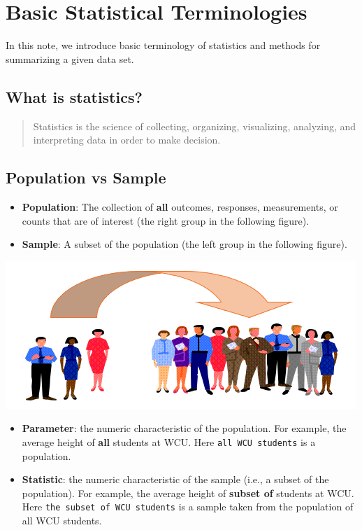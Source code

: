 \documentclass[
]{book}
\begin{document}
\hypertarget{basic-statistical-terminologies}{%
\section{Basic Statistical Terminologies}\label{basic-statistical-terminologies}}

In this note, we introduce basic terminology of statistics and methods for summarizing a given data set.

\hypertarget{what-is-statistics}{%
\subsection{What is statistics?}\label{what-is-statistics}}

\begin{quote}
Statistics is the science of collecting, organizing, visualizing, analyzing, and interpreting data in order to make decision.
\end{quote}

\hypertarget{population-vs-sample}{%
\subsection{Population vs Sample}\label{population-vs-sample}}

\begin{itemize}
\item
  \textbf{Population}: The collection of \textbf{all} outcomes, responses, measurements, or counts that are of interest (the right group in the following figure).
\item
  \textbf{Sample}: A subset of the population (the left group in the following figure).
\end{itemize}

\begin{center}\includegraphics[width=0.6\linewidth]{week01/popSample} \end{center}

\begin{itemize}
\item
  \textbf{Parameter}: the numeric characteristic of the population. For example, the average height of \textbf{all} students at WCU. Here \texttt{all\ WCU\ students} is a population.
\item
  \textbf{Statistic}: the numeric characteristic of the sample (i.e., a subset of the population). For example, the average height of \textbf{subset of} students at WCU. Here \texttt{the\ subset\ of\ WCU\ students} is a sample taken from the population of all WCU students.
\end{itemize}
\end{document}
